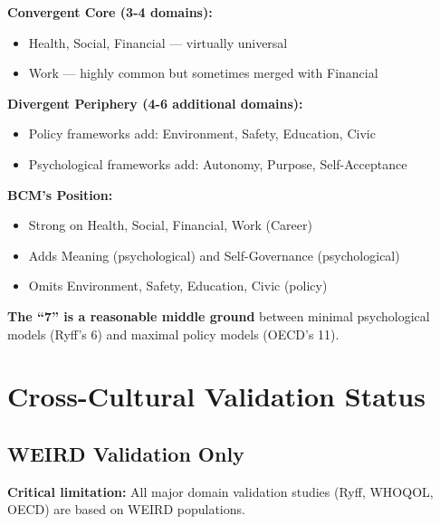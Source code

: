 \begin{tcolorbox}[colback=yellow!5!white, colframe=yellow!75!black, title=Cross-WEIRD Summary]

\textbf{Convergent Core (3-4 domains):}
\begin{itemize}[nosep]
\item Health, Social, Financial --- virtually universal
\item Work --- highly common but sometimes merged with Financial
\end{itemize}

\textbf{Divergent Periphery (4-6 additional domains):}
\begin{itemize}[nosep]
\item Policy frameworks add: Environment, Safety, Education, Civic
\item Psychological frameworks add: Autonomy, Purpose, Self-Acceptance
\end{itemize}

\textbf{BCM's Position:}
\begin{itemize}[nosep]
\item Strong on Health, Social, Financial, Work (Career)
\item Adds Meaning (psychological) and Self-Governance (psychological)
\item Omits Environment, Safety, Education, Civic (policy)
\end{itemize}

\textbf{The ``7'' is a reasonable middle ground} between minimal psychological models (Ryff's 6) and maximal policy models (OECD's 11).

\end{tcolorbox}


\section{Cross-Cultural Validation Status}
\label{sec:bj-crosscultural}

\subsection{WEIRD Validation Only}

\textbf{Critical limitation:} All major domain validation studies (Ryff, WHOQOL, OECD) are based on WEIRD populations.

